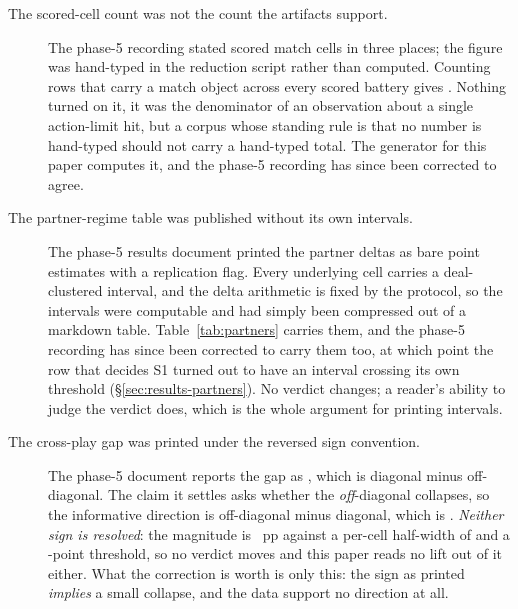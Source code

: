 \begin{description}
\item[The scored-cell count was not the count the artifacts support.] The phase-5 recording stated
  \vsevenScoredCellsRecorded{} scored match cells in three places; the figure was hand-typed in the
  reduction script rather than computed. Counting rows that carry a match object across every scored
  battery gives \textbf{\vsevenScoredCells{}}. Nothing turned on it, it was the denominator of an
  observation about a single action-limit hit, but a corpus whose standing rule is that no number
  is hand-typed should not carry a hand-typed total. The generator for this paper computes it, and
  the phase-5 recording has since been corrected to agree.

\item[The partner-regime table was published without its own intervals.]
  \label{app:corrections-intervals}
  The phase-5 results document printed the partner deltas as bare point estimates with a replication
  flag. Every underlying cell carries a deal-clustered interval, and the delta arithmetic is fixed by
  the protocol, so the intervals were computable and had simply been compressed out of a markdown
  table. Table~\ref{tab:partners} carries them, and the phase-5 recording has since been corrected to
  carry them too, at which point the row that decides S1 turned out to have an interval crossing
  its own threshold (\S\ref{sec:results-partners}). No verdict changes; a reader's ability to judge
  the verdict does, which is the whole argument for printing intervals.

\item[The cross-play gap was printed under the reversed sign convention.] The phase-5 document reports the gap as \vsevenXpGapRecorded{}, which is diagonal minus
  off-diagonal. The claim it settles asks whether the \emph{off}-diagonal collapses, so the informative direction is off-diagonal minus diagonal, which is \vsevenXpGap{}.
  \emph{Neither sign is resolved}: the magnitude is \vsevenXpGapAbs{}~pp against a per-cell
  half-width of \vsevenXpHalfWidth{} and a \vsevenStwoThreshold{}-point threshold, so no verdict
  moves and this paper reads no lift out of it either. What the correction is worth is only this:
  the sign as printed \emph{implies} a small collapse, and the data support no direction at all.


\end{description}
